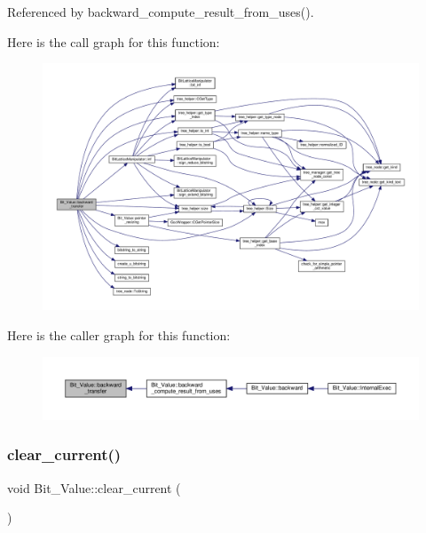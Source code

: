 Referenced by backward\+\_\+compute\+\_\+result\+\_\+from\+\_\+uses().

Here is the call graph for this function\+:
\nopagebreak
\begin{figure}[H]
\begin{center}
\leavevmode
\includegraphics[width=350pt]{df/d4b/classBit__Value_aec80afe9154981787b03d1a8c48df061_cgraph}
\end{center}
\end{figure}
Here is the caller graph for this function\+:
\nopagebreak
\begin{figure}[H]
\begin{center}
\leavevmode
\includegraphics[width=350pt]{df/d4b/classBit__Value_aec80afe9154981787b03d1a8c48df061_icgraph}
\end{center}
\end{figure}
\mbox{\label{classBit__Value_a03e2a690b6edfac4100e93554c43629c}} 
\subsubsection{\texorpdfstring{clear\+\_\+current()}{clear\_current()}}
{\footnotesize\ttfamily void Bit\+\_\+\+Value\+::clear\+\_\+current (\begin{DoxyParamCaption}{ }\end{DoxyParamCaption})\hspace{0.3cm}{\ttfamily [private]}}



